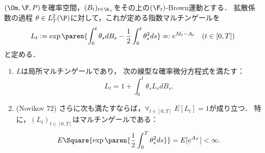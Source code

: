 \documentclass[uplatex,dvipdfmx]{jsreport}
\begin{document}
\begin{lemma}\label{lemma-Novikov}
    $(\Om,\F,P)$を確率空間，$(B_t)_{t\in\R_+}$をその上の$(\F_t)$-Brown運動とする．
    拡散係数の過程
    $\theta\in L^2_T(\P)$に対して，これが定める指数マルチンゲールを
    \[L_t:=\exp\paren{\int^t_0\theta_sdB_s-\frac{1}{2}\int^t_0\theta^2_sds}=:e^{M_t-A_t}\quad(t\in[0,T])\]
    と定める．
    \begin{enumerate}
        \item $L$は局所マルチンゲールであり，
        次の線型な確率微分方程式を満たす：
        \[L_t=1+\int^t_0\theta_sL_sdB_s.\]
        \item (Novikov 72) さらに次も満たすならば，$\forall_{t\in[0,T]}\;E[L_t]=1$が成り立つ．
        特に，$(L_t)_{t\in[0,T]}$はマルチンゲールである：
        \[E\Square{\exp\paren{\frac{1}{2}\int^T_0\theta^2_sds}}=E[e^{A_T}]<\infty.\]
    \end{enumerate}
\end{lemma}
\end{document}
